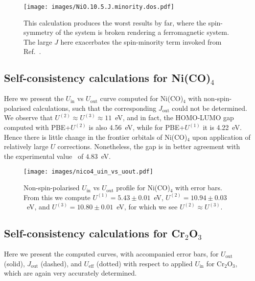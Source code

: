 \begin{figure}[th!]
\centering
\texttt{[image: images/NiO.10.5.J.minority.dos.pdf]}
\caption[NiO DOS with $U=10.5$ and $J=5.94$~eV including spin minority term]
{This calculation produces the worst results 
by far, where the spin-symmetry of the system 
is broken rendering a ferromagnetic system.
%
The large $J$ here exacerbates 
the spin-minority term invoked from Ref.~\cite{PhysRevB.84.115108}.}
\label{fig:NiO.10.5.J.minority}
\end{figure}
\newpage


\subsection{Self-consistency calculations for Ni(CO)$_4$}

Here we present the 
$U_\textrm{in}$ vs $U_\textrm{out}$ 
curve computed for Ni(CO)$_4$ 
with non-spin-polarised calculations, 
such that the corresponding 
$J_\textrm{out}$ could not be determined.
%
We observe that 
$U^{(2)}\approx U^{(3)}\approx 11$~eV, 
and in fact, 
the HOMO-LUMO gap computed with  
PBE+$U^{(2)}$ is also 4.56~eV, 
while for PBE+$U^{(1)}$ it is 4.22~eV.
%
Hence there is little change 
in the frontier orbitals of Ni(CO)$_4$ 
upon application of relatively 
large $U$ corrections.
%
Nonetheless, 
the gap is in better agreement 
with the experimental value~\cite{doi:10.1021/ja00274a073} 
of $4.83$~eV.

\begin{figure}[th!]
\centering
\texttt{[image: images/nico4\_uin\_vs\_uout.pdf]}
\caption[Self-consistency profile for Ni(CO)$_4$]
{Non-spin-polarised $U_\textrm{in}$ vs $U_\textrm{out}$ 
profile for Ni(CO)$_4$ with error bars.
%
From this we compute 
$U^{(1)}=5.43\pm0.01$~eV,
$U^{(2)}=10.94\pm0.03$~eV, 
and $U^{(3)}=10.80\pm0.01$~eV, 
for which we see $U^{(2)}\approx U^{(3)}$.}
\label{fig:nico4_uin_vs_uout}
\end{figure}
\newpage

\subsection{Self-consistency calculations for Cr$_2$O$_3$}

Here we present the computed curves, 
with accompanied error bars, for 
$U_\textrm{out}$ (solid), 
$J_\textrm{out}$ (dashed), 
and  $U_\textrm{eff}$ (dotted) 
with respect to applied $U_\textrm{in}$ 
for Cr$_2$O$_3$, 
which are again very accurately determined.

